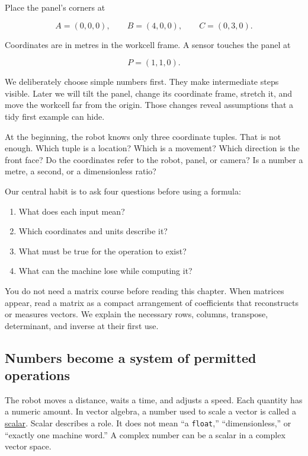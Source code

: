 Place the panel's corners at

\[
A=(0,0,0),\qquad B=(4,0,0),\qquad C=(0,3,0).
\]

Coordinates are in metres in the workcell frame. A sensor touches the panel at

\[
P=(1,1,0).
\]

We deliberately choose simple numbers first. They make intermediate steps visible. Later we will tilt the panel, change its coordinate frame, stretch it, and move the workcell far from the origin. Those changes reveal assumptions that a tidy first example can hide.

At the beginning, the robot knows only three coordinate tuples. That is not enough. Which tuple is a location? Which is a movement? Which direction is the front face? Do the coordinates refer to the robot, panel, or camera? Is a number a metre, a second, or a dimensionless ratio?

Our central habit is to ask four questions before using a formula:

\begin{enumerate}
\def\labelenumi{\arabic{enumi}.}
\tightlist
\item
  What does each input mean?
\item
  Which coordinates and units describe it?
\item
  What must be true for the operation to exist?
\item
  What can the machine lose while computing it?
\end{enumerate}

You do not need a matrix course before reading this chapter. When matrices appear, read a matrix as a compact arrangement of coefficients that reconstructs or measures vectors. We explain the necessary rows, columns, transpose, determinant, and inverse at their first use.

\subsection{Numbers become a system of permitted operations}\label{01-foundations-i-ch017-numbers-become-a-system-of-permitted-operations}

The robot moves a distance, waits a time, and adjusts a speed. Each quantity has a numeric amount. In vector algebra, a number used to scale a vector is called a \hyperref[01-foundations-i-ch017-numbers-become-a-system-of-permitted-operations]{scalar}. Scalar describes a role. It does not mean ``a \texttt{float},'' ``dimensionless,'' or ``exactly one machine word.'' A complex number can be a scalar in a complex vector space.


